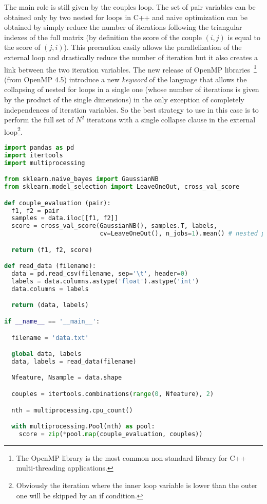 \documentclass{standalone}
\begin{document}
The main role is still given by the couples loop.
The set of pair variables can be obtained only by two nested for loops in C++ and naive optimization can be obtained by simply reduce the number of iterations following the triangular indexes of the full matrix (by definition the score of the couple $(i, j)$ is equal to the score of $(j, i)$).
This precaution easily allows the parallelization of the external loop and drastically reduce the number of iteration but it also creates a link between the two iteration variables.
The new release of OpenMP libraries~\cite{OpenMP}\footnote{
  The OpenMP library is the most common non-standard library for C++ multi-threading applications.
} (from OpenMP 4.5) introduce a new \emph{keyword} of the language that allows the collapsing of nested for loops in a single one (whose number of iterations is given by the product of the single dimensions) in the only exception of completely independences of iteration variables.
So the best strategy to use in this case is to perform the full set of $N^2$ iterations with a single \textsf{collapse} clause in the external loop\footnote{
  Obviously the iteration where the inner loop variable is lower than the outer one will be skipped by an if condition.
}.

\begin{lstlisting}[language=Python, caption=Python parallel couples evaluation algorithm, label=code:py_couples]
import pandas as pd
import itertools
import multiprocessing

from sklearn.naive_bayes import GaussianNB
from sklearn.model_selection import LeaveOneOut, cross_val_score

def couple_evaluation (pair):
  f1, f2 = pair
  samples = data.iloc[[f1, f2]]
  score = cross_val_score(GaussianNB(), samples.T, labels,
                          cv=LeaveOneOut(), n_jobs=1).mean() # nested parallel loops are not allowed

  return (f1, f2, score)

def read_data (filename):
  data = pd.read_csv(filename, sep='\t', header=0)
  labels = data.columns.astype('float').astype('int')
  data.columns = labels

  return (data, labels)

if __name__ == '__main__':

  filename = 'data.txt'

  global data, labels
  data, labels = read_data(filename)

  Nfeature, Nsample = data.shape

  couples = itertools.combinations(range(0, Nfeature), 2)

  nth = multiprocessing.cpu_count()

  with multiprocessing.Pool(nth) as pool:
    score = zip(*pool.map(couple_evaluation, couples))

\end{lstlisting}
\end{document}

